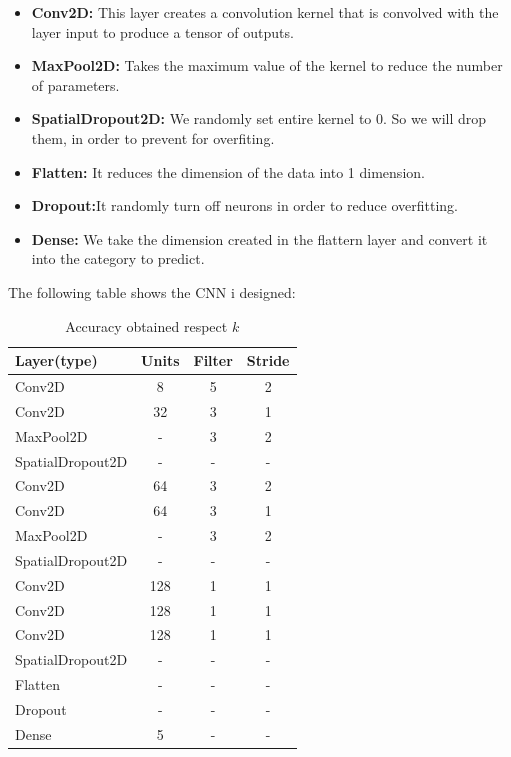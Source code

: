 \documentclass{article}
\begin{document}
\begin{itemize}
    \item \textbf{Conv2D:} This layer creates a convolution kernel that is convolved with the layer input to produce a tensor of outputs.
    \item \textbf{MaxPool2D:} Takes the maximum value of the kernel to reduce the number of parameters.
    \item \textbf{SpatialDropout2D:} We randomly set entire kernel to 0. So we will drop them, in order to prevent for overfiting.
    \item \textbf{Flatten:} It reduces the dimension of the data into 1 dimension.
    \item \textbf{Dropout:}It randomly turn off neurons in order to reduce overfitting.
    \item \textbf{Dense:} We take the dimension created in the flattern layer and convert it into the category to predict.
    
\end{itemize}
 
The following table shows the CNN i designed:

\begin{table}[ht]
    \centering
    \begin{tabular}{|l|ccc|}
        \hline
        \textbf{Layer(type)} & \textbf{Units} & \textbf{Filter} & \textbf{Stride} \\
        \hline
        Conv2D & 8 & 5 & 2 \\ \hline
        Conv2D & 32 & 3 & 1\\ \hline
        MaxPool2D & - & 3 & 2\\ \hline
        SpatialDropout2D & - & - & -\\ \hline

        Conv2D & 64 & 3 & 2\\ \hline
        Conv2D & 64 & 3 & 1\\ \hline
        MaxPool2D & - & 3 & 2\\ \hline
        SpatialDropout2D & - & - & -\\ \hline

        Conv2D & 128 & 1 & 1\\ \hline
        Conv2D & 128 & 1 & 1\\ \hline
        Conv2D & 128 & 1 & 1\\ \hline
        SpatialDropout2D & - & - & -\\ \hline

        Flatten & - & - & -\\ \hline
        Dropout & - & - & -\\ \hline
        Dense & 5 & - & -\\ \hline

    \end{tabular}
    \caption{Accuracy obtained respect $k$}
    \label{tab:knn_results}
\end{table}
\end{document}
